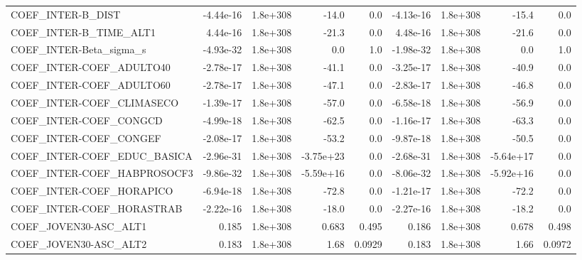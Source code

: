 \begin{tabular}{lrrrrrrrr}
COEF\_INTER-B\_DIST                 &   -4.44e-16 &     1.8e+308 &     -14.0 &      0.0 &  -4.13e-16 &    1.8e+308 &        -15.4 &           0.0 \\
COEF\_INTER-B\_TIME\_ALT1            &    4.44e-16 &     1.8e+308 &     -21.3 &      0.0 &   4.48e-16 &    1.8e+308 &        -21.6 &           0.0 \\
COEF\_INTER-Beta\_sigma\_s           &   -4.93e-32 &     1.8e+308 &       0.0 &      1.0 &  -1.98e-32 &    1.8e+308 &          0.0 &           1.0 \\
COEF\_INTER-COEF\_ADULTO40          &   -2.78e-17 &     1.8e+308 &     -41.1 &      0.0 &  -3.25e-17 &    1.8e+308 &        -40.9 &           0.0 \\
COEF\_INTER-COEF\_ADULTO60          &   -2.78e-17 &     1.8e+308 &     -47.1 &      0.0 &  -2.83e-17 &    1.8e+308 &        -46.8 &           0.0 \\
COEF\_INTER-COEF\_CLIMASECO         &   -1.39e-17 &     1.8e+308 &     -57.0 &      0.0 &  -6.58e-18 &    1.8e+308 &        -56.9 &           0.0 \\
COEF\_INTER-COEF\_CONGCD            &   -4.99e-18 &     1.8e+308 &     -62.5 &      0.0 &  -1.16e-17 &    1.8e+308 &        -63.3 &           0.0 \\
COEF\_INTER-COEF\_CONGEF            &   -2.08e-17 &     1.8e+308 &     -53.2 &      0.0 &  -9.87e-18 &    1.8e+308 &        -50.5 &           0.0 \\
COEF\_INTER-COEF\_EDUC\_BASICA       &   -2.96e-31 &     1.8e+308 & -3.75e+23 &      0.0 &  -2.68e-31 &    1.8e+308 &    -5.64e+17 &           0.0 \\
COEF\_INTER-COEF\_HABPROSOCF3       &   -9.86e-32 &     1.8e+308 & -5.59e+16 &      0.0 &  -8.06e-32 &    1.8e+308 &    -5.92e+16 &           0.0 \\
COEF\_INTER-COEF\_HORAPICO          &   -6.94e-18 &     1.8e+308 &     -72.8 &      0.0 &  -1.21e-17 &    1.8e+308 &        -72.2 &           0.0 \\
COEF\_INTER-COEF\_HORASTRAB         &   -2.22e-16 &     1.8e+308 &     -18.0 &      0.0 &  -2.27e-16 &    1.8e+308 &        -18.2 &           0.0 \\
COEF\_JOVEN30-ASC\_ALT1             &       0.185 &     1.8e+308 &     0.683 &    0.495 &      0.186 &    1.8e+308 &        0.678 &         0.498 \\
COEF\_JOVEN30-ASC\_ALT2             &       0.183 &     1.8e+308 &      1.68 &   0.0929 &      0.183 &    1.8e+308 &         1.66 &        0.0972 \\

\end{tabular}
